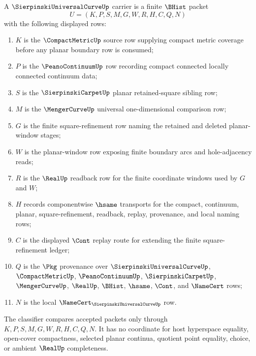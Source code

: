 \begin{definition}
\label{def:sierpinski-universal-curve-carrier}
A $\SierpinskiUniversalCurveUp$ carrier is a finite $\BHist$ packet
$$
U=(K,P,S,M,G,W,R,H,C,Q,N)
$$
with the following displayed rows:
\begin{enumerate}
\item $K$ is the $\CompactMetricUp$ source row supplying compact metric coverage before any planar boundary row is consumed;
\item $P$ is the $\PeanoContinuumUp$ row recording compact connected locally connected continuum data;
\item $S$ is the $\SierpinskiCarpetUp$ planar retained-square sibling row;
\item $M$ is the $\MengerCurveUp$ universal one-dimensional comparison row;
\item $G$ is the finite square-refinement row naming the retained and deleted planar-window stages;
\item $W$ is the planar-window row exposing finite boundary arcs and hole-adjacency reads;
\item $R$ is the $\RealUp$ readback row for the finite coordinate windows used by $G$ and $W$;
\item $H$ records componentwise $\hsame$ transports for the compact, continuum, planar, square-refinement, readback, replay, provenance, and local naming rows;
\item $C$ is the displayed $\Cont$ replay route for extending the finite square-refinement ledger;
\item $Q$ is the $\Pkg$ provenance over $\SierpinskiUniversalCurveUp$, $\CompactMetricUp$, $\PeanoContinuumUp$, $\SierpinskiCarpetUp$, $\MengerCurveUp$, $\RealUp$, $\BHist$, $\hsame$, $\Cont$, and $\NameCert$ rows;
\item $N$ is the local $\NameCert_{\SierpinskiUniversalCurveUp}$ row.
\end{enumerate}
The classifier compares accepted packets only through $K,P,S,M,G,W,R,H,C,Q,N$. It has no coordinate for host hyperspace equality, open-cover compactness, selected planar continua, quotient point equality, choice, or ambient $\RealUp$ completeness.
\end{definition}

